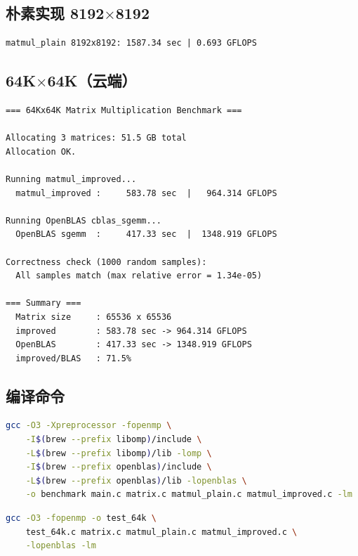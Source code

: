 \subsection{朴素实现 8192$\times$8192}

\begin{lstlisting}[language={},caption={8K 下的朴素基线}]
matmul_plain 8192x8192: 1587.34 sec | 0.693 GFLOPS
\end{lstlisting}

\subsection{64K$\times$64K（云端）}

\begin{lstlisting}[language={},caption={64K 基准测试（阿里云 g8y.8xlarge，32 核 ARM）}]
=== 64Kx64K Matrix Multiplication Benchmark ===

Allocating 3 matrices: 51.5 GB total
Allocation OK.

Running matmul_improved...
  matmul_improved :     583.78 sec  |   964.314 GFLOPS

Running OpenBLAS cblas_sgemm...
  OpenBLAS sgemm  :     417.33 sec  |  1348.919 GFLOPS

Correctness check (1000 random samples):
  All samples match (max relative error = 1.34e-05)

=== Summary ===
  Matrix size     : 65536 x 65536
  improved        : 583.78 sec -> 964.314 GFLOPS
  OpenBLAS        : 417.33 sec -> 1348.919 GFLOPS
  improved/BLAS   : 71.5%
\end{lstlisting}

\subsection{编译命令}

\begin{lstlisting}[language=bash,caption={本地（macOS）}]
gcc -O3 -Xpreprocessor -fopenmp \
    -I$(brew --prefix libomp)/include \
    -L$(brew --prefix libomp)/lib -lomp \
    -I$(brew --prefix openblas)/include \
    -L$(brew --prefix openblas)/lib -lopenblas \
    -o benchmark main.c matrix.c matmul_plain.c matmul_improved.c -lm
\end{lstlisting}

\begin{lstlisting}[language=bash,caption={云端（Linux ARM）}]
gcc -O3 -fopenmp -o test_64k \
    test_64k.c matrix.c matmul_plain.c matmul_improved.c \
    -lopenblas -lm
\end{lstlisting}
